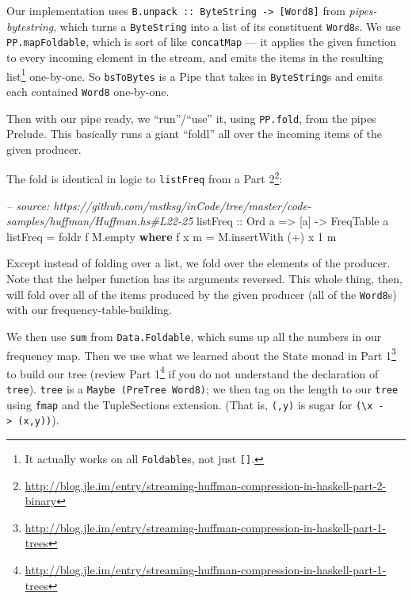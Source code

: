 \documentclass[]{article}
\newenvironment{Shaded}{}{}
\newcommand{\KeywordTok}[1]{\textcolor[rgb]{0.00,0.44,0.13}{\textbf{{#1}}}}
\newcommand{\DataTypeTok}[1]{\textcolor[rgb]{0.56,0.13,0.00}{{#1}}}
\newcommand{\DecValTok}[1]{\textcolor[rgb]{0.25,0.63,0.44}{{#1}}}
\newcommand{\CommentTok}[1]{\textcolor[rgb]{0.38,0.63,0.69}{\textit{{#1}}}}
\newcommand{\OtherTok}[1]{\textcolor[rgb]{0.00,0.44,0.13}{{#1}}}
\newcommand{\FunctionTok}[1]{\textcolor[rgb]{0.02,0.16,0.49}{{#1}}}
\newcommand{\NormalTok}[1]{{#1}}
\renewcommand{\href}[2]{#2\footnote{\url{#1}}}
\begin{document}
Our implementation uses
\texttt{B.unpack\ ::\ ByteString\ -\textgreater{}\ {[}Word8{]}} from
\emph{pipes-bytestring}, which turns a \texttt{ByteString} into a list of its
constituent \texttt{Word8}s. We use \texttt{PP.mapFoldable}, which is sort of
like \texttt{concatMap} --- it applies the given function to every incoming
element in the stream, and emits the items in the resulting list\footnote{It
  actually works on all \texttt{Foldable}s, not just \texttt{{[}{]}}.}
one-by-one. So \texttt{bsToBytes} is a Pipe that takes in \texttt{ByteString}s
and emits each contained \texttt{Word8} one-by-one.

Then with our pipe ready, we ``run''/``use'' it, using \texttt{PP.fold}, from
the pipes Prelude. This basically runs a giant ``foldl'' all over the incoming
items of the given producer.

The fold is identical in logic to \texttt{listFreq} from a
\href{http://blog.jle.im/entry/streaming-huffman-compression-in-haskell-part-2-binary}{Part
2}:

\begin{Shaded}
\begin{Highlighting}[]
\CommentTok{-- source: https://github.com/mstksg/inCode/tree/master/code-samples/huffman/Huffman.hs#L22-25}
\OtherTok{listFreq ::} \DataTypeTok{Ord} \NormalTok{a }\OtherTok{=>} \NormalTok{[a] }\OtherTok{->} \DataTypeTok{FreqTable} \NormalTok{a}
\NormalTok{listFreq }\FunctionTok{=} \NormalTok{foldr f M.empty}
  \KeywordTok{where}
    \NormalTok{f x m }\FunctionTok{=} \NormalTok{M.insertWith (}\FunctionTok{+}\NormalTok{) x }\DecValTok{1} \NormalTok{m}
\end{Highlighting}
\end{Shaded}

Except instead of folding over a list, we fold over the elements of the
producer. Note that the helper function has its arguments reversed. This whole
thing, then, will fold over all of the items produced by the given producer (all
of the \texttt{Word8}s) with our frequency-table-building.

We then use \texttt{sum} from \texttt{Data.Foldable}, which sums up all the
numbers in our frequency map. Then we use what we learned about the State monad
in
\href{http://blog.jle.im/entry/streaming-huffman-compression-in-haskell-part-1-trees}{Part
1} to build our tree (review
\href{http://blog.jle.im/entry/streaming-huffman-compression-in-haskell-part-1-trees}{Part
1} if you do not understand the declaration of \texttt{tree}). \texttt{tree} is
a \texttt{Maybe\ (PreTree\ Word8)}; we then tag on the length to our
\texttt{tree} using \texttt{fmap} and the TupleSections extension. (That is,
\texttt{(,y)} is sugar for
\texttt{(\textbackslash{}x\ -\textgreater{}\ (x,y))}).
\end{document}
